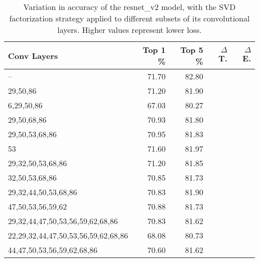 \begin{table}
\centering
\begin{tabular}{|l|r|r|r|r|}
\hline
Conv Layers & Top 1 \% & Top 5 \% & $\Delta$ T. & $\Delta$ E. \\\hline
-- & 71.70 & 82.80 &  & \\\hline
29,50,86 & 71.20 & 81.90 &  &  \\\hline
6,29,50,86 & 67.03 & 80.27 &  &  \\\hline
29,50,68,86 & 70.93 & 81.80 &  &  \\\hline
29,50,53,68,86 & 70.95 & 81.83 &  &  \\\hline
53 & 71.60 & 81.97 &  & \\\hline
29,32,50,53,68,86 & 71.20 & 81.85 &  &  \\\hline
32,50,53,68,86 & 70.85 & 81.73 &  &  \\\hline
29,32,44,50,53,68,86 & 70.83 & 81.90 &  &  \\\hline
47,50,53,56,59,62 & 70.88 & 81.73 &  &  \\\hline
29,32,44,47,50,53,56,59,62,68,86 & 70.83 & 81.62 &  &  \\\hline
22,29,32,44,47,50,53,56,59,62,68,86 & 68.08 & 80.73 &  &  \\\hline
44,47,50,53,56,59,62,68,86 & 70.60 & 81.62 &  &  \\\hline
\end{tabular}
\caption{Variation in accuracy of the resnet\_v2 model, with the SVD factorization strategy applied to different subsets of its convolutional layers. Higher values represent lower loss.}
\label{resnet_v2-accuracy}
\end{table}
